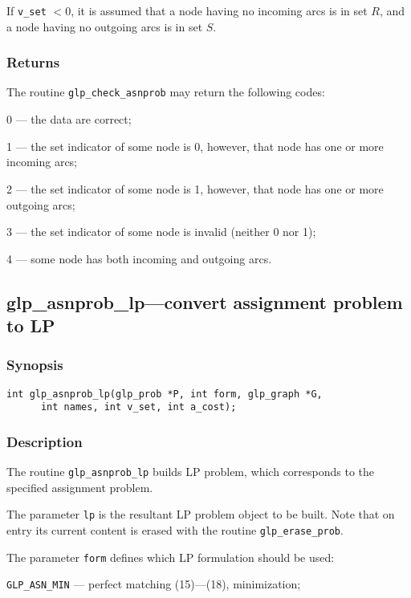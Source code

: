 \documentclass[dvipdfm,11pt]{report}
\begin{document}
\noindent
If \verb|v_set| $<0$, it is assumed that a node having no incoming arcs
is in set $R$, and a node having no outgoing arcs is in set $S$.

\subsubsection*{Returns}

The routine \verb|glp_check_asnprob| may return the following codes:

0 --- the data are correct;

1 --- the set indicator of some node is 0, however, that node has one
or more incoming arcs;

2 --- the set indicator of some node is 1, however, that node has one
or more outgoing arcs;

3 --- the set indicator of some node is invalid (neither 0 nor 1);

4 --- some node has both incoming and outgoing arcs.

\subsection{glp\_asnprob\_lp---convert assignment problem to LP}

\subsubsection*{Synopsis}

\begin{verbatim}
int glp_asnprob_lp(glp_prob *P, int form, glp_graph *G,
      int names, int v_set, int a_cost);
\end{verbatim}

\subsubsection*{Description}

The routine \verb|glp_asnprob_lp| builds LP problem, which corresponds
to the specified assignment problem.

The parameter \verb|lp| is the resultant LP problem object to be built.
Note that on entry its current content is erased with the routine
\verb|glp_erase_prob|.

The parameter \verb|form| defines which LP formulation should be used:

\verb|GLP_ASN_MIN| --- perfect matching (15)---(18), minimization;
\end{document}
